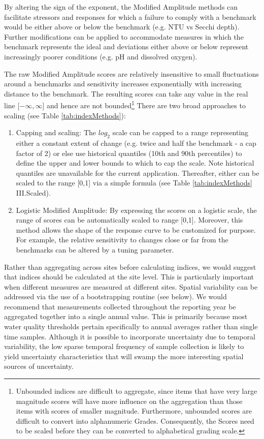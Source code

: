 By altering the sign of the exponent, the Modified Amplitude methods can facilitate stressors and
responses for which a failure to comply with a benchmark would be either above or below the
benchmark (e.g. NTU vs Secchi depth).  Further modifications can be applied to accommodate measures
in which the benchmark represents the ideal and deviations either above or below represent
increasingly poorer conditions (e.g. pH and dissolved oxygen).
  
The raw Modified Amplitude scores are relatively insensitive to small fluctuations around a
benchmarks and sensitivity increases exponentially with increasing distance to the benchmark.  The
resulting scores can take any value in the real line [$-\infty, \infty$] and hence are not
bounded\footnote{Unbounded indices are difficult to aggregate, since items that have very large
magnitude scores will have more influence on the aggregation than those items with scores of smaller
magnitude.  Furthermore, unbounded scores are difficult to convert into alphanumeric Grades.
Consequently, the Scores need to be scaled before they can be converted to alphabetical grading
scale.}  There are two broad approaches to scaling (see Table \ref{tab:indexMethods}):

\begin{enumerate}
\item Capping and scaling: The $log_2$ scale can be capped to a range representing either a constant
extent of change (e.g. twice and half the benchmark - a cap factor of 2) or else use historical
quantiles (10th and 90th percentiles) to define the upper and lower bounds to which to cap the
scale.  Note historical quantiles are unavailable for the current application. Thereafter, either
can be scaled to the range [0,1] via a simple formula (see Table \ref{tab:indexMethods} III.Scaled).
  
\item Logistic Modified Amplitude: By expressing the scores on a logistic scale, the range of scores
can be automatically scaled to range [0,1].  Moreover, this method allows the shape of the response
curve to be customized for purpose.  For example, the relative sensitivity to changes close or far
from the benchmarks can be altered by a tuning parameter.
\end{enumerate}

Rather than aggregating across sites before calculating indices, we would suggest that indices
should be calculated at the site level.  This is particularly important when different measures are
measured at different sites.  Spatial variability can be addressed via the use of a bootstrapping
routine (see below).  We would recommend that measurements collected throughout the reporting year
be aggregated together into a single annual value.  This is primarily because most water quality
thresholds pertain specifically to annual averages rather than single time samples. Although it is
possible to incorporate uncertainty due to temporal variability, the low sparse temporal frequency
of sample collection is likely to yield uncertainty characteristics that will swamp the more
interesting spatial sources of uncertainty.

